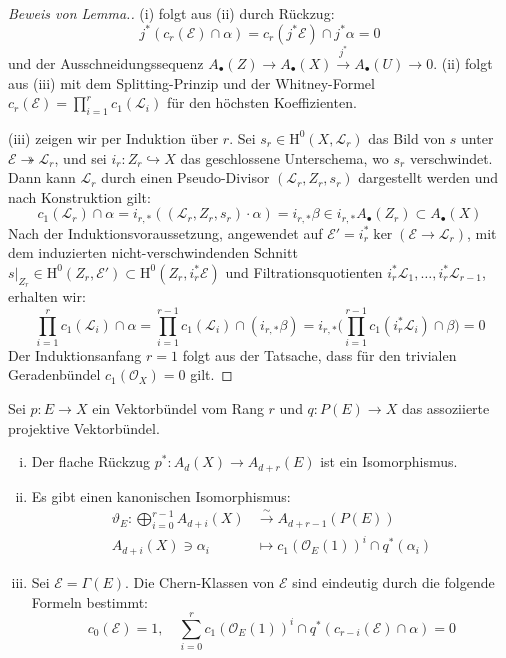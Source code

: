 \documentclass[10pt,a4paper]{article}
\begin{document}
\begin{proof}[Beweis von Lemma.]
(i) folgt aus (ii) durch Rückzug:
\[ j^\ast(c_r(\mathcal{E})\cap\alpha) = c_r(j^\ast\mathcal{E})\cap j^\ast\alpha = 0 \]
und der Ausschneidungssequenz $A_\bullet(Z)\to A_\bullet(X) \stackrel{j^\ast}{\to} A_\bullet(U)\to 0$. (ii) folgt aus (iii) mit dem Splitting-Prinzip und der Whitney-Formel $c_r(\mathcal{E}) = \prod_{i=1}^rc_1(\mathcal{L}_i)$ für den höchsten Koeffizienten.

(iii) zeigen wir per Induktion über $r$. Sei $s_r\in\mathrm{H}^0(X, \mathcal{L}_r)$ das Bild von $s$ unter $\mathcal{E}\twoheadrightarrow\mathcal{L}_r$, und sei $i_r: Z_r\hookrightarrow X$ das geschlossene Unterschema, wo $s_r$ verschwindet. Dann kann $\mathcal{L}_r$ durch einen Pseudo-Divisor $(\mathcal{L}_r,Z_r,s_r)$ dargestellt werden und nach Konstruktion gilt:
\[ c_1(\mathcal{L}_r)\cap \alpha = i_{r,\ast}((\mathcal{L}_r, Z_r, s_r)\cdot\alpha) = i_{r,\ast}\beta \in i_{r,\ast}A_\bullet(Z_r)\subset A_\bullet(X) \]
Nach der Induktionsvoraussetzung, angewendet auf $\mathcal{E}' = i_r^\ast \ker(\mathcal{E}\to\mathcal{L}_r)$, mit dem induzierten nicht-verschwindenden Schnitt $s|_{Z_r}\in\mathrm{H}^0(Z_r,\mathcal{E}')\subset \mathrm{H}^0(Z_r, i_r^\ast\mathcal{E})$ und Filtrationsquotienten $i^\ast_r\mathcal{L}_1,\ldots,i_r^\ast\mathcal{L}_{r-1}$, erhalten wir:
\[ \prod_{i=1}^rc_1(\mathcal{L}_i)\cap\alpha = \prod_{i=1}^{r-1} c_1(\mathcal{L}_i)\cap (i_{r,\ast}\beta) = i_{r,\ast}\Big(\prod_{i=1}^{r-1} c_1(i_r^\ast\mathcal{L}_i)\cap\beta\Big) = 0 \]
Der Induktionsanfang $r=1$ folgt aus der Tatsache, dass für den trivialen Geradenbündel $c_1(\mathcal{O}_X) = 0$ gilt.
\end{proof}

\begin{theorem}
Sei $p:E\to X$ ein Vektorbündel vom Rang $r$ und $q:P(E)\to X$ das assoziierte projektive Vektorbündel.
\begin{enumerate}[(i)]
\item Der flache Rückzug $p^\ast: A_d(X)\to A_{d+r}(E)$ ist ein Isomorphismus.
\item Es gibt einen kanonischen Isomorphismus:
\begin{align*}
\vartheta_E: \bigoplus_{i=0}^{r-1}A_{d+i}(X) &\stackrel{\sim}{\longrightarrow} A_{d+r-1}(P(E))\\
A_{d+i}(X)\ni \alpha_i &\longmapsto c_1(\mathcal{O}_E(1))^i\cap q^\ast(\alpha_i)
\end{align*}
\item Sei $\mathcal{E} = \Gamma(E)$. Die Chern-Klassen von $\mathcal{E}$ sind eindeutig durch die folgende Formeln bestimmt:
\[ c_0(\mathcal{E}) = 1,\quad \sum_{i=0}^r c_1(\mathcal{O}_E(1))^i\cap q^\ast(c_{r-i}(\mathcal{E})\cap\alpha) = 0 \]
\end{enumerate}
\end{theorem}
\end{document}
